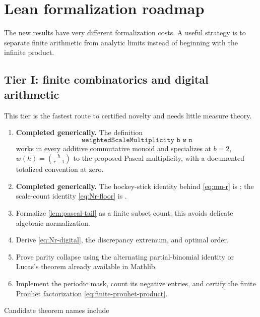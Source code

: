 \documentclass[11pt,a4paper]{article}
\theoremstyle{frontier}
\theoremstyle{definition}
\begin{document}
\section{Lean formalization roadmap}\label{sec:lean}

The new results have very different formalization costs.  A useful strategy is to separate finite arithmetic from analytic limits instead of beginning with the infinite product.

\subsection{Tier I: finite combinatorics and digital arithmetic}

This tier is the fastest route to certified novelty and needs little measure theory.

\begin{enumerate}[label=\textbf{I.\arabic*}]
\item \textbf{Completed generically.}  The definition
\[
 \texttt{weightedScaleMultiplicity b w n}
\]
works in every additive commutative monoid and specializes at
$b=2$, $w(h)=\binom h{r-1}$ to the proposed Pascal multiplicity, with a
documented totalized convention at zero.
\item \textbf{Completed generically.}  The hockey-stick identity behind
\eqref{eq:mu-r} is ; the scale-count
identity \eqref{eq:Nr-floor} is .
\item Formalize \cref{lem:pascal-tail} as a finite subset count; this avoids delicate algebraic normalization.
\item Derive \eqref{eq:Nr-digital}, the discrepancy extremum, and optimal order.
\item Prove parity collapse using the alternating partial-binomial identity or Lucas's theorem already available in Mathlib.
\item Implement the periodic mask, count its negative entries, and certify the finite Prouhet factorization \eqref{eq:finite-prouhet-product}.
\end{enumerate}

Candidate theorem names include
\begin{center}
\begin{minipage}{0.88\textwidth}
\small
{}\\
\\
\\
\\
\\
\end{minipage}
\end{center}
\end{document}
